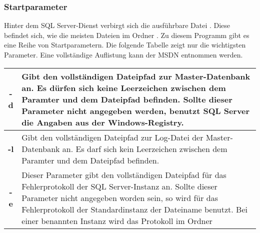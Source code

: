         \subsubsection{Startparameter}
          Hinter dem SQL Server-Dienst verbirgt sich die ausführbare Datei
          . Diese befindet sich, wie die meisten
           Dateien im Ordner . Zu diesem
          Programm gibt es eine Reihe von Startparametern. Die folgende Tabelle zeigt nur die
          wichtigsten Parameter. Eine vollständige Auflistung kann der MSDN
          entnommen werden.
          \begin{literaturinternet}
            \item \cite{ms162819}
          \end{literaturinternet}
          \begin{center}
            \begin{small}
            \tablefirsthead {
              \hline
            }
            \tablehead{
            }
            \tabletail {
              \hline
            }
            \tablelasttail {
              \hline
            }
              \begin{supertabular}{|c|p{10cm}|}
                \textbf{-d} & Gibt den vollständigen Dateipfad zur
                Master-Datenbank an. Es dürfen sich keine Leerzeichen zwischen
                dem Paramter und dem Dateipfad befinden. Sollte dieser Parameter
                nicht angegeben werden, benutzt SQL Server die Angaben aus der
                Windows-Registry. \\
                \hline
                \textbf{-l} & Gibt den vollständigen Dateipfad zur Log-Datei der
                Master-Datenbank an. Es darf sich kein Leerzeichen zwischen dem
                Paramter und dem Dateipfad befinden. \\
                \hline
                \textbf{-e} & Dieser Parameter gibt den vollständigen Dateipfad
                f\"ur das Fehler\-protokoll der SQL Server-Instanz an. Sollte
                dieser Parameter nicht angegeben worden sein, so wird f\"ur das Fehlerprotokoll der
                Standardinstanz der Dateiname  benutzt. Bei
                einer benannten Instanz wird das Protokoll im Ordner 
\end{supertabular}
\end{small}
\end{center}
